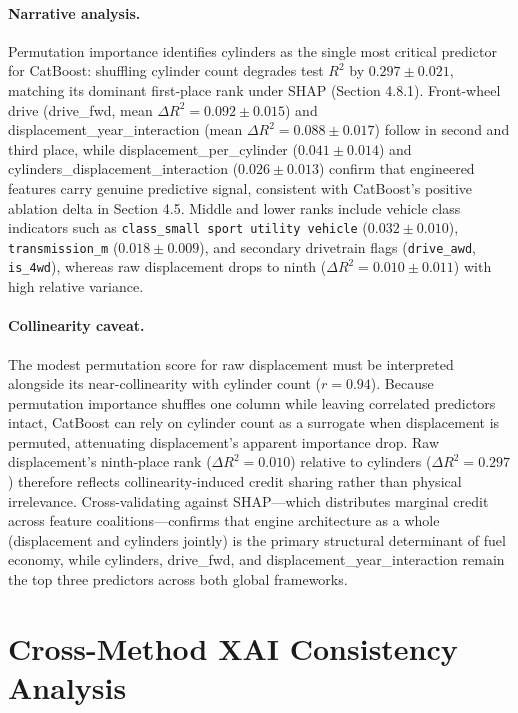 \paragraph{Narrative analysis.}
Permutation importance identifies cylinders as the single most critical predictor for CatBoost: shuffling cylinder count degrades test \(R^2\) by \(0.297 \pm 0.021\), matching its dominant first-place rank under SHAP (Section 4.8.1). Front-wheel drive (drive\_fwd, mean \(\Delta R^2 = 0.092 \pm 0.015\)) and displacement\_year\_interaction (mean \(\Delta R^2 = 0.088 \pm 0.017\)) follow in second and third place, while displacement\_per\_cylinder (\(0.041 \pm 0.014\)) and cylinders\_displacement\_interaction (\(0.026 \pm 0.013\)) confirm that engineered features carry genuine predictive signal, consistent with CatBoost's positive ablation delta in Section 4.5. Middle and lower ranks include vehicle class indicators such as \texttt{class\_small sport utility vehicle} (\(0.032 \pm 0.010\)), \texttt{transmission\_m} (\(0.018 \pm 0.009\)), and secondary drivetrain flags (\texttt{drive\_awd}, \texttt{is\_4wd}), whereas raw displacement drops to ninth (\(\Delta R^2 = 0.010 \pm 0.011\)) with high relative variance.

\paragraph{Collinearity caveat.}
The modest permutation score for raw displacement must be interpreted alongside its near-collinearity with cylinder count (\(r = 0.94\)). Because permutation importance shuffles one column while leaving correlated predictors intact, CatBoost can rely on cylinder count as a surrogate when displacement is permuted, attenuating displacement's apparent importance drop. Raw displacement's ninth-place rank (\(\Delta R^2 = 0.010\)) relative to cylinders (\(\Delta R^2 = 0.297\)) therefore reflects collinearity-induced credit sharing rather than physical irrelevance. Cross-validating against SHAP---which distributes marginal credit across feature coalitions---confirms that engine architecture as a whole (displacement and cylinders jointly) is the primary structural determinant of fuel economy, while cylinders, drive\_fwd, and displacement\_year\_interaction remain the top three predictors across both global frameworks.


\section{Cross-Method XAI Consistency Analysis}

